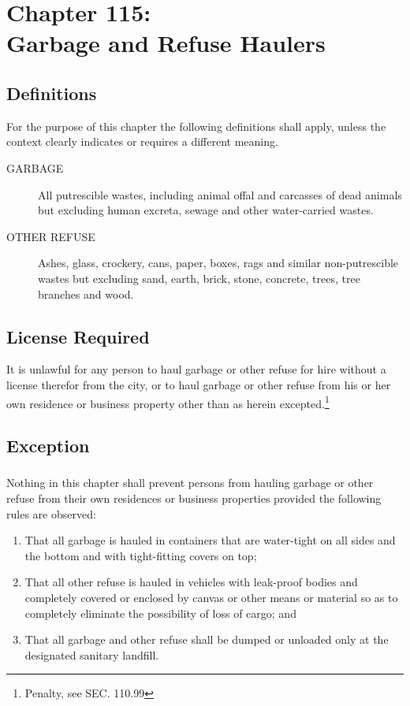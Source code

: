 \chapter*{Chapter 115: \\
	Garbage and Refuse Haulers}
    \vfill
    \minitoc
    \pagebreak

\section{Definitions}
For the purpose of this chapter the following definitions shall apply, unless the context clearly indicates or requires a different meaning.
\begin{description}
    \item[GARBAGE] All putrescible wastes, including animal offal and carcasses of dead animals but excluding human excreta, sewage and other water-carried wastes.
    \item[OTHER REFUSE] Ashes, glass, crockery, cans, paper, boxes, rags and similar non-putrescible wastes but excluding sand, earth, brick, stone, concrete, trees, tree branches and wood.
\end{description}

\section{License Required}
It is unlawful for any person to haul garbage or other refuse for hire without a license therefor from the city, or to haul garbage or other refuse from his or her own residence or business property other than as herein excepted.\footnote{Penalty, see SEC. 110.99}

\section{Exception}
\subsection{}
Nothing in this chapter shall prevent persons from hauling garbage or other refuse from their own residences or business properties provided the following rules are observed:
\begin{enumerate}[{\indent}1)]
    \item That all garbage is hauled in containers that are water-tight on all sides and the bottom and with tight-fitting covers on top;
    \item That all other refuse is hauled in vehicles with leak-proof bodies and completely covered or enclosed by canvas or other means or material so as to completely eliminate the possibility of loss of cargo; and
    \item That all garbage and other refuse shall be dumped or unloaded only at the designated sanitary landfill.
\end{enumerate}
